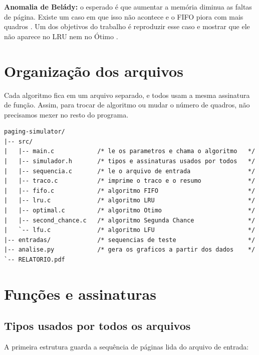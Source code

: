 \documentclass[12pt]{article}
\begin{document}
\textbf{Anomalia de Belády:} o esperado é que aumentar a memória diminua as
faltas de página. Existe um caso em que isso não acontece e o FIFO piora com
mais quadros \cite{belady1969}. Um dos objetivos do trabalho é reproduzir esse
caso e mostrar que ele não aparece no LRU nem no Ótimo \cite{arpaci2018}.

\section{Organização dos arquivos}
\label{sec:organizacao}

Cada algoritmo fica em um arquivo separado, e todos usam a mesma assinatura de
função. Assim, para trocar de algoritmo ou mudar o número de quadros, não
precisamos mexer no resto do programa.

{\scriptsize
\begin{verbatim}
paging-simulator/
|-- src/
|   |-- main.c            /* le os parametros e chama o algoritmo   */
|   |-- simulador.h       /* tipos e assinaturas usados por todos   */
|   |-- sequencia.c       /* le o arquivo de entrada                */
|   |-- traco.c           /* imprime o traco e o resumo             */
|   |-- fifo.c            /* algoritmo FIFO                         */
|   |-- lru.c             /* algoritmo LRU                          */
|   |-- optimal.c         /* algoritmo Otimo                        */
|   |-- second_chance.c   /* algoritmo Segunda Chance               */
|   `-- lfu.c             /* algoritmo LFU                          */
|-- entradas/             /* sequencias de teste                    */
|-- analise.py            /* gera os graficos a partir dos dados    */
`-- RELATORIO.pdf
\end{verbatim}
}

\section{Funções e assinaturas}
\label{sec:funcoes}

\subsection{Tipos usados por todos os arquivos}
\label{sec:tipos}

A primeira estrutura guarda a sequência de páginas lida do arquivo de entrada:
\end{document}
